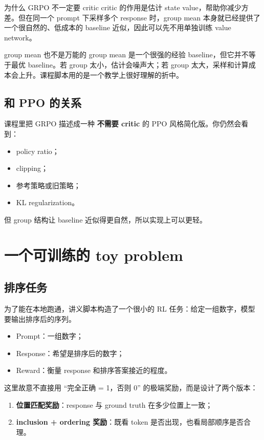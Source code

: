 \documentclass[a4paper]{article}
\begin{document}
\begin{knowledgebox}{为什么 GRPO 不一定要 critic}
critic 的作用是估计 state value，帮助你减少方差。但在同一个 prompt 下采样多个 response 时，group mean 本身就已经提供了一个很自然的、低成本的 baseline 近似，因此可以先不用单独训练 value network。
\end{knowledgebox}



\begin{warningbox}{group mean 也不是万能的}
group mean 是一个很强的经验 baseline，但它并不等于最优 baseline。若 group 太小，估计会噪声大；若 group 太大，采样和计算成本会上升。课程脚本用的是一个教学上很好理解的折中。
\end{warningbox}

\subsection{和 PPO 的关系}

课程里把 GRPO 描述成一种 \textbf{不需要 critic} 的 PPO 风格简化版。你仍然会看到：
\begin{itemize}
    \item policy ratio；
    \item clipping；
    \item 参考策略或旧策略；
    \item KL regularization。
\end{itemize}

但 group 结构让 baseline 近似得更自然，所以实现上可以更轻。


\section{一个可训练的 toy problem}

\subsection{排序任务}

为了能在本地跑通，讲义脚本构造了一个很小的 RL 任务：给定一组数字，模型要输出排序后的序列。

\begin{itemize}
    \item Prompt：一组数字；
    \item Response：希望是排序后的数字；
    \item Reward：衡量 response 和排序答案接近的程度。
\end{itemize}

这里故意不直接用 “完全正确 = 1，否则 0” 的极端奖励，而是设计了两个版本：
\begin{enumerate}
    \item \textbf{位置匹配奖励}：response 与 ground truth 在多少位置上一致；
    \item \textbf{inclusion + ordering 奖励}：既看 token 是否出现，也看局部顺序是否合理。
\end{enumerate}
\end{document}
